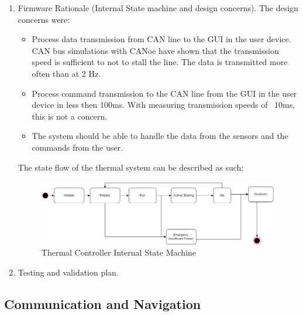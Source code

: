 \begin{enumerate}
\begin{enumerate}
            \item Firmware Rationale (Internal State machine and design concerns).
                The design concerns were:
                \begin{itemize}
                    \item Process data transmission from CAN line to the GUI in the user device. CAN bus simulations with CANoe have shown that the transmission speed is sufficient to not to stall the line. The data is transmitted more often than at 2 Hz.
                    \item Process command transmission to the CAN line from the GUI in the user device in less then 100ms. With measuring transmission speeds of ~10ms, this is not a concern.
                    \item The system should be able to handle the data from the sensors and the commands from the user.
                \end{itemize}
        The state flow of the thermal system can be described as such:
        \begin{figure}[H]
            \centering
            \includegraphics[width=0.7\linewidth]{texfiles/elec/eimg/ThermoStateflow.png}
            \caption{Thermal Controller Internal State Machine}
            \label{fig:Thermal stateflow}
        \end{figure}


            \item Testing and validation plan.
        \end{enumerate}
\end{enumerate}

\subsection{Communication and Navigation}
